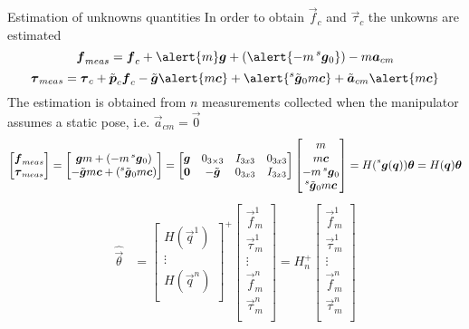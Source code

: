 \begin{frame}[shrink=20]{Estimation of unknowns quantities}
  In order to obtain $\vec{f}_{c}$ and $\vec{\tau}_{c}$ the \alert{unkowns} are estimated
  \[
  \vec{f}_{meas} = \vec{f}_{c} +\alert{m} \vec{g} +(\alert{-m \prescript{s}{}{ \vec{g}}_{0}}) - m  \vec{a}_{cm}
  \]
  \[
  \vec{\tau}_{meas} = \vec{\tau}_{c} + \tilde{\vec{p}}_{c}  \vec{f}_{c}
  - \tilde{\vec{g}} \alert{m\vec{c}} + \alert{\prescript{s}{}{ \tilde{\vec{g}}}_{0} m\vec{c}} +  \tilde{\vec{a}}_{cm} \alert{m  \vec{c}}
  \]
  The estimation is obtained from $n$ measurements collected when the manipulator assumes a \alert{static} pose, i.e. $\vec{a}_{cm} = \vec{0}$
  \[
  \begin{bmatrix}
    \vec{f}_{meas} \\
    \vec{\tau}_{meas}
  \end{bmatrix} =
  \begin{bmatrix}
    \vec{g} m + (-m \prescript{s}{}{ \vec{g}}_{0}) \\
    -\tilde{\vec{g}} m\vec{c} + (\prescript{s}{}{ \tilde{\vec{g}}}_{0} m\vec{c})
  \end{bmatrix}
  =
  \begin{bmatrix}
    \vec{g} & 0_{3 \times 3} & I_{3x3} & 0_{3x3} \\
    \vec{0} & -\tilde{\vec{g}} & 0_{3x3} & I_{3x3}
  \end{bmatrix}
  \begin{bmatrix}
    m \\
    m \vec{c} \\
    -m \prescript{s}{}{ \vec{g}}_{0} \\
    \prescript{s}{}{ \tilde{\vec{g}}}_{0} m\vec{c}
  \end{bmatrix}
  =
  H(\prescript{s}{}{\vec{g}(\vec{q})}) \vec{\theta}
  =
  H(\vec{q}) \vec{\theta}
  \]
  \[
  \begin{split}
    \hat{\vec{\theta}} &=
    \begin{bmatrix}
      H(\vec{q}^{1})\\
      \vdots \\
      H(\vec{q}^{n})\\
    \end{bmatrix}^{+}
    \begin{bmatrix}
      \vec{f}_{m}^{1} \\
      \vec{\tau}_{m}^{1} \\
      \vdots \\
      \vec{f}_{m}^{n} \\
      \vec{\tau}_{m}^{n} \\
    \end{bmatrix}
    =
    H_n^{+}
    \begin{bmatrix}
      \vec{f}_{m}^{1} \\
      \vec{\tau}_{m}^{1} \\
      \vdots \\
      \vec{f}_{m}^{n} \\
      \vec{\tau}_{m}^{n} \\
    \end{bmatrix}\\
  \end{split}
  \]
\end{frame}

